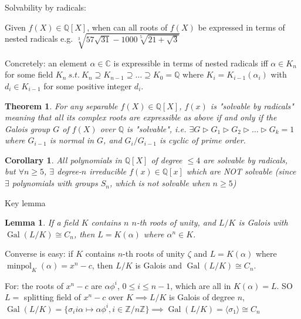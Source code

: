 \documentclass{article}
\newcommand{\C}{\mathbb{C}}
\newcommand{\Z}{\mathbb{Z}}
\newcommand{\Q}{\mathbb{Q}}
\newcommand{\st}{\ s.t.\ }
\def \Gal {\operatorname{Gal}}
\def \minpol {\operatorname{minpol}}
\newtheorem*{theorem}{Theorem}
\newtheorem*{corollary}{Corollary}
\newtheorem*{lemma}{Lemma}
\theoremstyle{definition}
\theoremstyle{remark}
\begin{document}
Solvability by radicals:

Given $f(X) \in \Q[X]$, when can all roots of $f(X)$ be expressed in terms of nested radicals e.g. $\sqrt[3]{57\sqrt{31} - 1000\sqrt[5]{21+\sqrt{3}}}$

Concretely: an element $\alpha \in \C$ is expressible in terms of nested radicals iff $\alpha \in K_n$ for some field $K_n \st K_n \supseteq K_{n-1} \supseteq \ldots \supseteq K_{0} = \Q$ where $K_i = K_{i-1}(\alpha_i)$ with $d_i \in K_{i-1}$ for some positive integer $d_i$.

\begin{theorem}
  For any separable $f(X) \in \Q[X]$, $f(x)$ is "solvable by radicals" meaning that all its complex roots are expressible as above if and only if the Galois group $G$ of $f(X)$ over $\Q$ is "solvable", i.e. $\exists G \triangleright G_1 \triangleright G_2 \triangleright \ldots \triangleright G_k = 1$ where $G_{i-1}$ is normal in $G$, and $G_i/G_{i-1}$ is cyclic of prime order.
\end{theorem}

\begin{corollary}
  All polynomials in $\Q[X]$ of degree $\leq 4$ are solvable by radicals, but $\forall n \geq 5$, $\exists$ degree-$n$ irreducible $f(x) \in \Q[x]$ which are NOT solvable (since $\exists$ polynomials with groups $S_n$, which is not solvable when $n \geq 5$)
\end{corollary}

Key lemma \begin{lemma}
  If a field $K$ contains $n$ $n$-th roots of unity, and $L/K$ is Galois with $\Gal(L/K) \cong C_n$, then $L = K(\alpha)$ where $\alpha^n \in K$.
\end{lemma}

Converse is easy: if $K$ contains $n$-th roots of unity $\zeta$ and $L = K(\alpha)$ where $\minpol_K(\alpha) = x^n - c$, then $L/K$ is Galois and $\Gal(L/K) \cong C_n$.

For: the roots of $x^n - c$ are $\alpha \phi^i$, $0 \leq i \leq n - 1$, which are all in $K(\alpha) = L$. SO $L = $ splitting field of $x^n - c$ over $K \implies L/K$ is Galois of degree $n$, $\Gal(L/K) = \{\sigma_i i\alpha \mapsto \alpha \phi^i, i \in \Z/n\Z\} \implies \Gal(L/K) = \langle\sigma_1\rangle \cong C_n$
\end{document}
